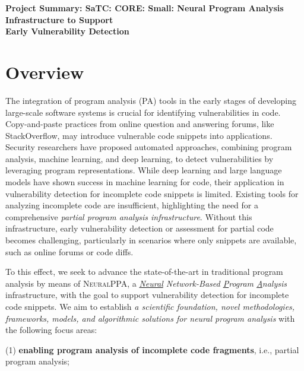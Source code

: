 \documentclass[11pt]{article}
\newcommand{\tool}{\textsc{NeuralPPA}\xspace}
\begin{document}



\begin{center}
  {\bf Project Summary: SaTC: CORE: Small: Neural Program Analysis Infrastructure to Support\\ Early Vulnerability Detection}
\end{center}
\vspace{-.1in}



\section{Overview}

The integration of program analysis (PA) tools in the early stages of
developing large-scale software systems is crucial for identifying
vulnerabilities in code. Copy-and-paste practices from online question
and answering forums, like StackOverflow, may introduce vulnerable
code snippets into applications. Security researchers have proposed
automated approaches, combining program analysis, machine learning,
and deep learning, to detect vulnerabilities by leveraging program
representations. While deep learning and large language models have
shown success in machine learning for code, their application in
vulnerability detection for incomplete code snippets is
limited. Existing tools for analyzing incomplete code are
insufficient, highlighting the need for a comprehensive
\textit{partial program analysis infrastructure}. Without this
infrastructure, early vulnerability detection or assessment for
partial code becomes challenging, particularly in scenarios where only
snippets are available, such as online forums or code diffs.

To this effect, we seek to advance the state-of-the-art in traditional program analysis by means of {\tool}, a {\em \underline{Neural} Network-Based \underline{P}rogram \underline{A}nalysis} infrastructure, with the goal to support vulnerability detection for incomplete code snippets. We aim to establish {\em a scientific foundation, novel methodologies, frameworks, models, and algorithmic solutions for neural program analysis} with the following focus areas:

(1) {\bf enabling program analysis of incomplete code fragments}, i.e., partial program analysis;

\end{document}
